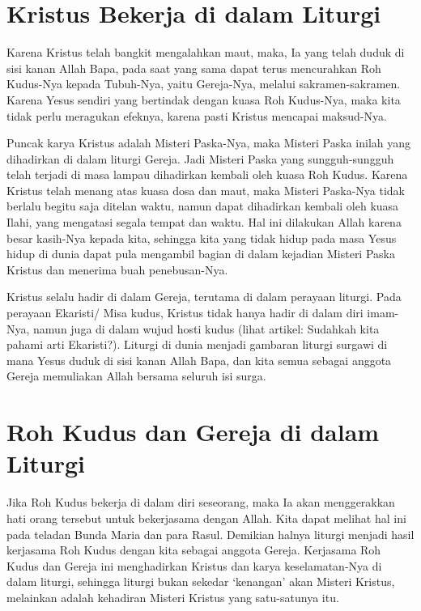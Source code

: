 \section*{Kristus Bekerja di dalam Liturgi}

Karena Kristus telah bangkit mengalahkan maut, maka, Ia yang telah duduk di sisi kanan Allah Bapa, pada saat yang sama dapat terus mencurahkan Roh Kudus-Nya kepada Tubuh-Nya, yaitu Gereja-Nya, melalui sakramen-sakramen. Karena Yesus sendiri yang bertindak dengan kuasa Roh Kudus-Nya, maka kita tidak perlu meragukan efeknya, karena pasti Kristus mencapai maksud-Nya.

Puncak karya Kristus adalah Misteri Paska-Nya, maka Misteri Paska inilah yang dihadirkan di dalam liturgi Gereja. Jadi Misteri Paska yang sungguh-sungguh telah terjadi di masa lampau dihadirkan kembali oleh kuasa Roh Kudus. Karena Kristus telah menang atas kuasa dosa dan maut, maka Misteri Paska-Nya tidak berlalu begitu saja ditelan waktu, namun dapat dihadirkan kembali oleh kuasa Ilahi, yang mengatasi segala tempat dan waktu. Hal ini dilakukan Allah karena besar kasih-Nya kepada kita, sehingga kita yang tidak hidup pada masa Yesus hidup di dunia dapat pula mengambil bagian di dalam kejadian Misteri Paska Kristus dan menerima buah penebusan-Nya.

Kristus selalu hadir di dalam Gereja, terutama di dalam perayaan liturgi. Pada perayaan Ekaristi/ Misa kudus, Kristus tidak hanya hadir di dalam diri imam-Nya, namun juga di dalam wujud hosti kudus (lihat artikel: Sudahkah kita pahami arti Ekaristi?). Liturgi di dunia menjadi gambaran liturgi surgawi di mana Yesus duduk di sisi kanan Allah Bapa, dan kita semua sebagai anggota Gereja memuliakan Allah bersama seluruh isi surga.

\section*{Roh Kudus dan Gereja di dalam Liturgi}

Jika Roh Kudus bekerja di dalam diri seseorang, maka Ia akan menggerakkan hati orang tersebut untuk bekerjasama dengan Allah. Kita dapat melihat hal ini pada teladan Bunda Maria dan para Rasul. Demikian halnya liturgi menjadi hasil kerjasama Roh Kudus dengan kita sebagai anggota Gereja. Kerjasama Roh Kudus dan Gereja ini menghadirkan Kristus dan karya keselamatan-Nya di dalam liturgi, sehingga liturgi bukan sekedar ‘kenangan’ akan Misteri Kristus, melainkan adalah kehadiran Misteri Kristus yang satu-satunya itu.

